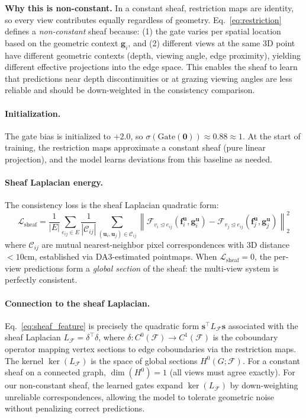 \textbf{Why this is non-constant.} In a constant sheaf, restriction maps are identity, so every view contributes equally regardless of geometry. Eq.~\cref{eq:restriction} defines a \emph{non-constant} sheaf because: (1) the gate varies per spatial location based on the geometric context $\mathbf{g}_i$, and (2) different views at the same 3D point have different geometric contexts (depth, viewing angle, edge proximity), yielding different effective projections into the edge space. This enables the sheaf to learn that predictions near depth discontinuities or at grazing viewing angles are less reliable and should be down-weighted in the consistency comparison.

\paragraph{Initialization.} The gate bias is initialized to $+2.0$, so $\sigma(\text{Gate}(\mathbf{0})) \approx 0.88 \approx 1$. At the start of training, the restriction maps approximate a constant sheaf (pure linear projection), and the model learns deviations from this baseline as needed.

\paragraph{Sheaf Laplacian energy.} The consistency loss is the sheaf Laplacian quadratic form:
\begin{equation}
\mathcal{L}_{\text{sheaf}} = \frac{1}{|E|} \sum_{e_{ij} \in E} \frac{1}{|\mathcal{C}_{ij}|} \sum_{(\mathbf{u}_i, \mathbf{u}_j) \in \mathcal{C}_{ij}} \left\| \mathcal{F}_{v_i \trianglelefteq e_{ij}}(\mathbf{f}_i^{\mathbf{u}}, \mathbf{g}_i^{\mathbf{u}}) - \mathcal{F}_{v_j \trianglelefteq e_{ij}}(\mathbf{f}_j^{\mathbf{u}}, \mathbf{g}_j^{\mathbf{u}}) \right\|_2^2
\label{eq:sheaf_feature}
\end{equation}
where $\mathcal{C}_{ij}$ are mutual nearest-neighbor pixel correspondences with 3D distance $< 10$cm, established via DA3-estimated pointmaps. When $\mathcal{L}_{\text{sheaf}} = 0$, the per-view predictions form a \emph{global section} of the sheaf: the multi-view system is perfectly consistent.

\paragraph{Connection to the sheaf Laplacian.} Eq.~\cref{eq:sheaf_feature} is precisely the quadratic form $\mathbf{s}^\top L_\mathcal{F} \mathbf{s}$ associated with the sheaf Laplacian $L_\mathcal{F} = \delta^\top \delta$, where $\delta: C^0(\mathcal{F}) \to C^1(\mathcal{F})$ is the coboundary operator mapping vertex sections to edge coboundaries via the restriction maps. The kernel $\ker(L_\mathcal{F})$ is the space of global sections $H^0(G; \mathcal{F})$. For a constant sheaf on a connected graph, $\dim(H^0) = 1$ (all views must agree exactly). For our non-constant sheaf, the learned gates expand $\ker(L_\mathcal{F})$ by down-weighting unreliable correspondences, allowing the model to tolerate geometric noise without penalizing correct predictions.

